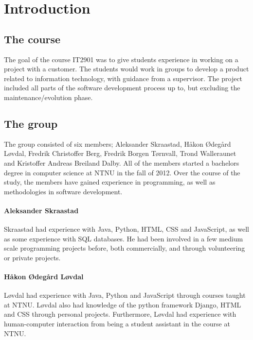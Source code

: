 
\chapter{Introduction}
\label{ch:introduction}

\section{The course}
\label{sec:introduction-the_course}

The goal of the course IT2901 was to give students experience in working on a project with a customer. The students would work in groups to develop a product related to information technology, with guidance from a supervisor. The project included all parts of the software development process up to, but excluding the maintenance/evolution phase.

\section{The group}
\label{sec:introduction-the_group}

The group consisted of six members; Aleksander Skraastad, Håkon Ødegård Løvdal, Fredrik Christoffer Berg, Fredrik Borgen Tørnvall, Trond Walleraunet and Kristoffer Andreas Breiland Dalby. All of the members started a bachelors degree in computer science at NTNU in the fall of 2012. Over the course of the study, the members have gained experience in programming, as well as methodologies in software development.

\subsubsection{Aleksander Skraastad}
Skraastad had experience with Java, Python, HTML, CSS and JavaScript, as well as some experience with SQL databases. He had been involved in a few medium scale programming projects before, both commercially, and through volunteering or private projects.

\subsubsection{Håkon Ødegård Løvdal}

Løvdal had experience with Java, Python and JavaScript through courses taught at NTNU. Løvdal also had knowledge of the python framework Django, HTML and CSS through personal projects. Furthermore, Løvdal had experience with human-computer interaction from being a student assistant in the course at NTNU. 

